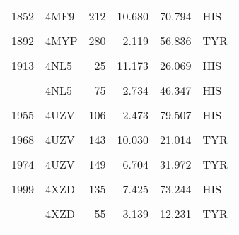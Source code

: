 \begin{table}
\begin{tabular}{llrrrl}
			1852 & 4MF9 & 212 & 10.680 & 70.794 & HIS\\
			\addlinespace
			\cellcolor{gray!6}{1886} & \cellcolor{gray!6}{4MYP} & \cellcolor{gray!6}{209} & \cellcolor{gray!6}{6.410} & \cellcolor{gray!6}{71.980} & \cellcolor{gray!6}{TYR}\\
			1892 & 4MYP & 280 & 2.119 & 56.836 & TYR\\
			\cellcolor{gray!6}{1899} & \cellcolor{gray!6}{4MYP} & \cellcolor{gray!6}{289} & \cellcolor{gray!6}{5.495} & \cellcolor{gray!6}{20.187} & \cellcolor{gray!6}{TYR}\\
			1913 & 4NL5 & 25 & 11.173 & 26.069 & HIS\\
			\cellcolor{gray!6}{1916} & \cellcolor{gray!6}{4NL5} & \cellcolor{gray!6}{28} & \cellcolor{gray!6}{11.403} & \cellcolor{gray!6}{84.281} & \cellcolor{gray!6}{HIS}\\
			\addlinespace
			1935 & 4NL5 & 75 & 2.734 & 46.347 & HIS\\
			\cellcolor{gray!6}{1937} & \cellcolor{gray!6}{4NL5} & \cellcolor{gray!6}{78} & \cellcolor{gray!6}{7.980} & \cellcolor{gray!6}{36.780} & \cellcolor{gray!6}{HIS}\\
			1955 & 4UZV & 106 & 2.473 & 79.507 & HIS\\
			\cellcolor{gray!6}{1957} & \cellcolor{gray!6}{4UZV} & \cellcolor{gray!6}{109} & \cellcolor{gray!6}{6.542} & \cellcolor{gray!6}{40.788} & \cellcolor{gray!6}{TYR}\\
			1968 & 4UZV & 143 & 10.030 & 21.014 & TYR\\
			\addlinespace
			\cellcolor{gray!6}{1971} & \cellcolor{gray!6}{4UZV} & \cellcolor{gray!6}{146} & \cellcolor{gray!6}{7.929} & \cellcolor{gray!6}{59.304} & \cellcolor{gray!6}{TYR}\\
			1974 & 4UZV & 149 & 6.704 & 31.972 & TYR\\
			\cellcolor{gray!6}{1994} & \cellcolor{gray!6}{4UZV} & \cellcolor{gray!6}{93} & \cellcolor{gray!6}{5.892} & \cellcolor{gray!6}{59.726} & \cellcolor{gray!6}{TYR}\\
			1999 & 4XZD & 135 & 7.425 & 73.244 & HIS\\
			\cellcolor{gray!6}{2001} & \cellcolor{gray!6}{4XZD} & \cellcolor{gray!6}{140} & \cellcolor{gray!6}{7.989} & \cellcolor{gray!6}{42.711} & \cellcolor{gray!6}{HIS}\\
			\addlinespace
			2019 & 4XZD & 55 & 3.139 & 12.231 & TYR\\
			\cellcolor{gray!6}{2022} & \cellcolor{gray!6}{4XZD} & \cellcolor{gray!6}{75} & \cellcolor{gray!6}{1.999} & \cellcolor{gray!6}{46.839} & \cellcolor{gray!6}{TYR}\\

\end{tabular}
\end{table}
